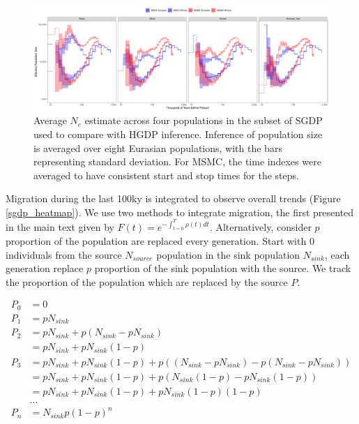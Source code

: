 \documentclass{article}
\begin{document}
\begin{figure}
	\centering
	\includegraphics[width=\textwidth]{../plot/ne/average_ne_subset.pdf}
	\caption{Average $N_e$ estimate across four populations in the subset of SGDP used to compare with HGDP inference. Inference of population size is averaged over eight Eurasian populations, with the bars representing standard deviation. For MSMC, the time indexes were averaged to have consistent start and stop times for the steps.}
	\label{averages}
\end{figure}

Migration during the last 100ky is integrated to observe overall trends (Figure \ref{sgdp_heatmap}). We use two methods to integrate migration, the first presented in the main text given by $F(t) = e^{- \int_{t=0}^T \rho(t) dt}$. Alternatively, consider $p$ proportion of the population are replaced every generation. Start with 0 individuals from the source $N_{source}$ population in the sink population $N_{sink}$, each generation replace $p$ proportion of the sink population with the source. We track the proportion of the population which are replaced by the source $P$.  

$$ \begin{aligned} P_0 &= 0 \\ P_1 &= pN_{sink} \\ P_2 &= pN_{sink} + p(N_{sink} - pN_{sink}) \\ &= pN_{sink} + pN_{sink}(1-p) \\ P_3 &= pN_{sink} + pN_{sink}(1-p) + p((N_{sink}-pN_{sink}) - p(N_{sink}-pN_{sink})) \\ &= pN_{sink} + pN_{sink}(1-p)+p(N_{sink}(1-p)-pN_{sink}(1-p)) \\ &= pN_{sink}+pN_{sink}(1-p)+pN_{sink}(1-p)(1-p) \\ &\dots \\ P_n &=N_{sink}p(1-p)^n \end{aligned} $$
\end{document}
